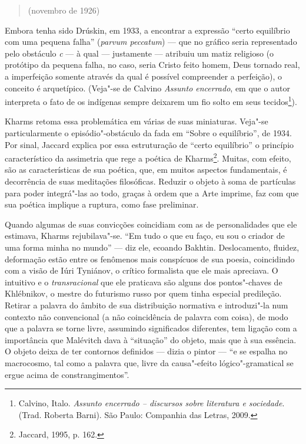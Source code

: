 {{{\begin{quote}
\noindent{}(novembro de 1926)
\end{quote}

Embora tenha sido Drúskin, em 1933, a encontrar a expressão ``certo
equilíbrio com uma pequena falha'' (\emph{parvum peccatum}) --- que no
gráfico seria representado pelo obstáculo \emph{c} --- à qual ---
justamente --- atribuiu um matiz religioso (o protótipo da pequena falha,
no caso, seria Cristo feito homem, Deus tornado real, a imperfeição
somente através da qual é possível compreender a perfeição), o conceito
é arquetípico. (Veja"-se de Calvino \emph{Assunto
encerrado}, em que o autor interpreta o fato de os indígenas sempre
deixarem um fio solto em seus tecidos\footnote{Calvino, Italo. \emph{Assunto encerrado -- discursos sobre literatura
e sociedade}. (Trad. Roberta Barni). São Paulo: Companhia das Letras, 2009.}).

Kharms retoma essa problemática em várias de suas miniaturas. Veja"-se
particularmente o episódio"-obstáculo da fada em ``Sobre o equilíbrio'',
de 1934. Por sinal, Jaccard explica por essa estruturação de ``certo equilíbrio'' o princípio característico da
assimetria que rege a poética de Kharms\footnote{Jaccard, 1995, p. 162.}. Muitas, com efeito, são as
características de sua poética, que, em muitos aspectos fundamentais, é
decorrência de suas meditações filosóficas. Reduzir o objeto à soma de
partículas para poder integrá"-las ao todo, graças à ordem que a Arte
imprime, faz com que sua poética implique a ruptura, como fase
preliminar.

Quando algumas de suas convicções coincidiam com as de personalidades
que ele estimava, Kharms rejubilava"-se. ``Em tudo o que eu faço, eu sou
o criador de uma forma minha no mundo'' --- diz ele, ecoando Bakhtin.
Deslocamento, fluidez, deformação estão entre os fenômenos mais
conspícuos de sua poesia, coincidindo com a visão de Iúri Tyniánov, o
crítico formalista que ele mais apreciava. O intuitivo e o
\emph{transracional} que ele praticava são alguns dos pontos"-chaves de
Khlébnikov, o mestre do futurismo russo por quem tinha especial
predileção. Retirar a palavra do âmbito de sua distribuição normativa e
introduzi"-la num contexto não convencional (a não coincidência de
palavra com coisa), de modo que a palavra se torne livre, assumindo
significados diferentes, tem ligação com a importância que Malévitch
dava à ``situação'' do objeto, mais que à sua essência. O objeto deixa
de ter contornos definidos --- dizia o pintor --- ``e se espalha no
macrocosmo, tal como a palavra que, livre da causa"-efeito
lógico"-gramatical se ergue acima de constrangimentos''.

}}}
